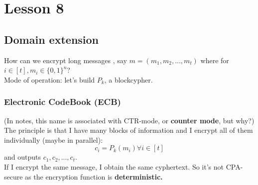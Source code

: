 \chapter*{Lesson 8}
\section{Domain extension}

How can we encrypt long messages , say $m=(m_{1}, m_{2}, ..., m_{t})$ where
for $i \in [t], m_{i} \in \{0,1\}^{n} $?\\

Mode of operation: let's build $P_{k}$, a blockcypher.\\

\subsection{Electronic CodeBook (ECB)}

(In notes, this name is associated with CTR-mode, or \textbf{counter mode}, but
why?)\\
The principle is that I have many blocks of information and I encrypt all of
them individually (maybe in parallel):
\[
    c_{i}=P_{k}(m_{i}) \forall i \in [t]
\]
and outputs $c_{1}, c_{2}, ..., c_{t}$.\\

If I encrypt the same message, I obtain the same cyphertext. So it's not
CPA-secure as the encryption function is \textbf{deterministic.}

